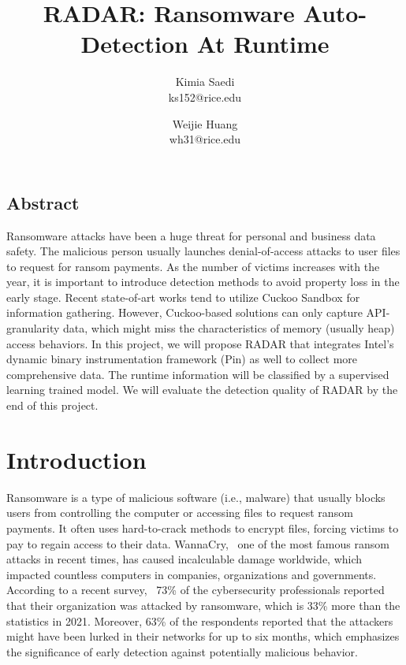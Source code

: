 \documentclass[letterpaper,twocolumn,10pt]{article}
\newcommand{\work}{\mbox{\textsc{RADAR}}\xspace}
\begin{document}
\date{}

\title{\Large \bf \work: Ransomware Auto-Detection At Runtime}

\author{
{\rm Kimia Saedi}\\
ks152@rice.edu
\and
{\rm Weijie Huang}\\
wh31@rice.edu
}

\maketitle



\subsection*{Abstract}

Ransomware attacks have been a huge threat for personal and business data safety. 
The malicious person usually launches denial-of-access attacks to user files to request for ransom payments.
As the number of victims increases with the year, it is important to introduce detection methods to avoid property loss in the early stage.
Recent state-of-art works tend to utilize Cuckoo Sandbox for information gathering.
However, Cuckoo-based solutions can only capture API-granularity data, which might miss the characteristics of memory (usually heap) access behaviors.
In this project, we will propose \work that integrates Intel’s dynamic binary instrumentation framework (Pin) as well to collect more comprehensive data.
The runtime information will be classified by a supervised learning trained model.
We will evaluate the detection quality of \work by the end of this project.

\section{Introduction}

Ransomware is a type of malicious software (i.e., malware) that usually blocks users from controlling the computer or accessing files to request ransom payments.
It often uses hard-to-crack methods to encrypt files, forcing victims to pay to regain access to their data.
WannaCry,~\cite{wannacry_2017} one of the most famous ransom attacks in recent times, has caused incalculable damage worldwide, which impacted countless computers in companies, organizations and governments.
According to a recent survey,~\cite{cybereason_2022} 73\% of the cybersecurity professionals reported that their organization was attacked by ransomware, which is 33\% more than the statistics in 2021.
Moreover, 63\% of the respondents reported that the attackers might have been lurked in their networks for up to six months, which emphasizes the significance of early detection against potentially malicious behavior.
\end{document}
